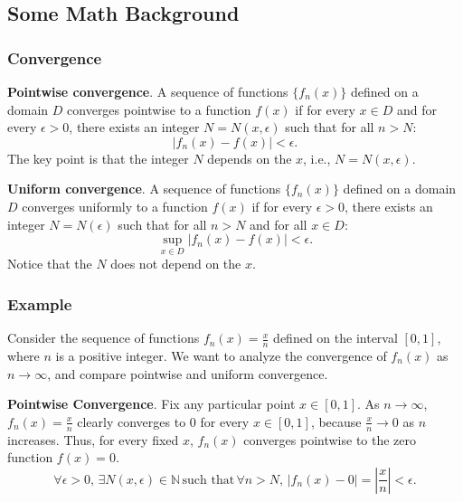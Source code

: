 \subsection{Some Math Background}

\subsubsection{Convergence}
    \textbf{Pointwise convergence}.
    A sequence of functions $ \{ f_n(x) \} $ defined on a domain $D$ converges pointwise to a function $f(x)$ if for every $x \in D$ and for every $ \epsilon > 0 $, there exists an integer $ N = N(x, \epsilon) $ such that for all $ n > N$:
        \begin{equation}
                |f_n(x) - f(x)| < \epsilon.
        \end{equation}
    The key point is that the integer $N$ depends on the $x$, i.e., $N = N(x, \epsilon)$.

    \textbf{Uniform convergence}.
    A sequence of functions $\{ f_n(x) \} $ defined on a domain $D $ converges uniformly to a function $f(x)$ if for every $\epsilon > 0$, there exists an integer $N = N(\epsilon)$ such that for all $ n > N $ and for all $x \in D$:
    \begin{equation}
        \sup_{x \in D} |f_n(x) - f(x)| < \epsilon.        
    \end{equation}
    Notice that the $N$ does not depend on the $x$. 

    \subsubsection*{Example}
    Consider the sequence of functions $ f_n(x) = \frac{x}{n} $ defined on the interval $ [0, 1] $, where $ n $ is a positive integer. We want to analyze the convergence of $ f_n(x) $ as $ n \to \infty $, and compare pointwise and uniform convergence.
    
    \textbf{Pointwise Convergence}.
    Fix any particular point $ x \in [0, 1] $. As $ n \to \infty $, $ f_n(x) = \frac{x}{n} $ clearly converges to 0 for every $ x \in [0, 1] $, because $ \frac{x}{n} \to 0 $ as $ n $ increases.
    Thus, for every fixed $ x $, $ f_n(x) $ converges pointwise to the zero function $ f(x) = 0 $.
    \begin{equation}
    \forall \epsilon > 0, \, \exists N(x, \epsilon) \in \mathbb{N} \, \text{such that} \, \forall n > N, \, |f_n(x) - 0| = \left|\frac{x}{n}\right| < \epsilon.
    \end{equation}
    
